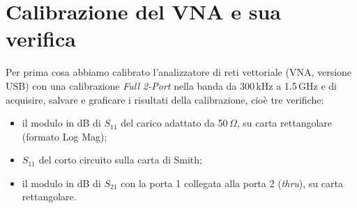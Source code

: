 \documentclass[11pt,a4paper,oneside]{book}
\begin{document}


\frontmatter 
\tableofcontents

\mainmatter



\chapter{Calibrazione del VNA e sua verifica}
Per prima cosa abbiamo calibrato l'analizzatore di reti vettoriale (VNA, versione USB) con una calibrazione \emph{Full 2-Port} nella banda da 300\,kHz a 1.5\,GHz e di acquisire, salvare e graficare i risultati della calibrazione, cioè tre verifiche:
\begin{itemize}
  \item il modulo in dB di $S_{11}$ del carico adattato da 50\,$\Omega$, su carta rettangolare (formato Log Mag);
  \item $S_{11}$ del corto circuito sulla carta di Smith;
  \item il modulo in dB di $S_{21}$ con la porta 1 collegata alla porta 2 (\emph{thru}), su carta rettangolare.
\end{itemize}
\end{document}
